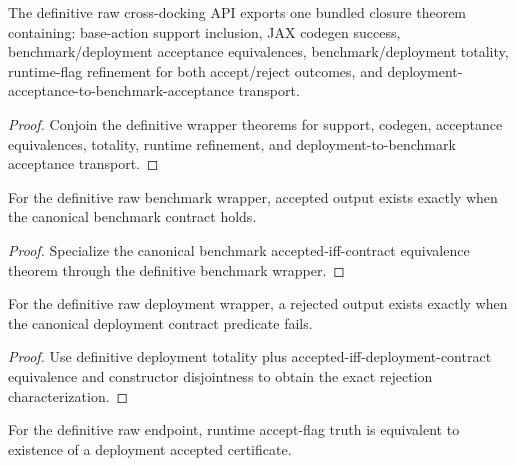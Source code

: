 \begin{theorem}\label{thm:definitive-raw-crossdock-full-closure-bundle}
The definitive raw cross-docking API exports one bundled closure theorem containing: base-action support inclusion, JAX codegen success, benchmark/deployment acceptance equivalences, benchmark/deployment totality, runtime-flag refinement for both accept/reject outcomes, and deployment-acceptance-to-benchmark-acceptance transport.
\end{theorem}

\begin{proof}
Conjoin the definitive wrapper theorems for support, codegen, acceptance equivalences, totality, runtime refinement, and deployment-to-benchmark acceptance transport.
\end{proof}

\begin{theorem}\label{thm:definitive-raw-benchmark-accepted-iff-contract}
For the definitive raw benchmark wrapper, accepted output exists exactly when the canonical benchmark contract holds.
\end{theorem}

\begin{proof}
Specialize the canonical benchmark accepted-iff-contract equivalence theorem through the definitive benchmark wrapper.
\end{proof}

\begin{theorem}\label{thm:definitive-raw-deployment-rejected-iff-not-contract}
For the definitive raw deployment wrapper, a rejected output exists exactly when the canonical deployment contract predicate fails.
\end{theorem}

\begin{proof}
Use definitive deployment totality plus accepted-iff-deployment-contract equivalence and constructor disjointness to obtain the exact rejection characterization.
\end{proof}

\begin{theorem}\label{thm:definitive-accept-flag-iff-deployment-accepted}
For the definitive raw endpoint, runtime accept-flag truth is equivalent to existence of a deployment accepted certificate.
\end{theorem}

